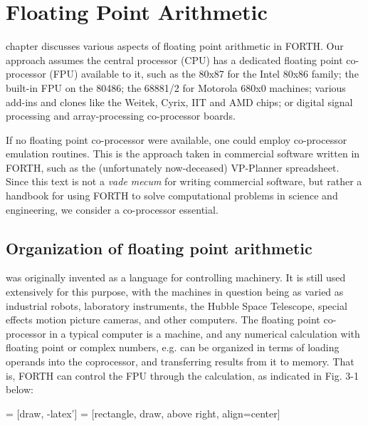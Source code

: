 
\chapter{Floating Point Arithmetic}

\tableofcontents

 chapter discusses various aspects of floating point arithmetic in
FORTH. Our approach assumes the central processor (CPU) has a dedicated floating
point co-processor (FPU)
available to it, such as the 80x87 for the Intel 80x86 family; the
built-in FPU on the 80486; the 68881/2 for Motorola 680x0
machines; various add-ins and clones like the Weitek, Cyrix, IIT
and AMD chips; or digital signal processing and array-processing
co-processor boards.

If no floating point co-processor were available, one could
employ co-processor emulation routines. This is the approach
taken in commercial software written in FORTH, such as the
(unfortunately now-deceased) VP-Planner spreadsheet. Since
this text is not a \textit{vade mecum} for writing commercial software, but
rather a handbook for using FORTH to solve computational
problems in science and engineering, we consider a co-processor
essential.

\section{Organization of floating point arithmetic}

 was originally invented as a language for controlling 
machinery. It is still used extensively for this purpose, with the
machines in question being as varied as industrial robots,
laboratory instruments, the Hubble Space Telescope, special
effects motion picture cameras, and other computers. The floating point
co-processor in a typical computer is a machine, and any
numerical calculation with floating point or complex numbers,
e.g. can be organized in terms of loading operands into the
coprocessor, and transferring results from it to memory. That is,
FORTH can control the FPU through the calculation, as indicated in Fig. 3-1
below:

 = [draw, -latex']
 = [rectangle, draw, above right, align=center]

